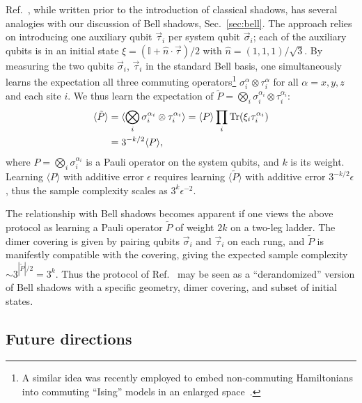 \documentclass[a4paper,twocolumns,11pt,accepted=2024-03-04]{quantumarticle}
\begin{document}
Ref.~\cite{jiang_optimal_2020}, while written prior to the introduction of classical shadows, has several analogies with our discussion of Bell shadows, Sec.~\ref{sec:bell}. 
The approach relies on introducing one auxiliary qubit $\vec{\tau}_i$ per system qubit $\vec{\sigma}_i$; each of the auxiliary qubits is in an initial state $\xi = (\mathbb{I} + \hat{n}\cdot \vec{\tau})/2$ with $\hat{n} = (1,1,1)/\sqrt{3}$. By measuring the two qubits $\vec{\sigma}_i$, $\vec{\tau}_i$ in the standard Bell basis, one simultaneously learns the expectation all three commuting operators\footnote{A similar idea was recently employed to embed non-commuting Hamiltonians into commuting ``Ising'' models in an enlarged space~\cite{verresen_everything_2023}.} $\sigma^\alpha_i \otimes \tau^\alpha_i $ for all $\alpha = x,y,z$ and each site $i$.
We thus learn the expectation of $\tilde{P} = \bigotimes_i \sigma_i^{\alpha_i} \otimes \tau_i^{\alpha_i}$: 
\begin{align}
    \langle \tilde{P} \rangle 
    & = \langle \bigotimes_i \sigma_i^{\alpha_i} \otimes \tau_i^{\alpha_i} \rangle = \langle P\rangle \prod_i \Tr(\xi_i \tau_i^{\alpha_i}) \nonumber \\
    & = 3^{-k/2} \langle P\rangle,
\end{align}
where $P = \bigotimes_i \sigma_i^{\alpha_i}$ is a Pauli operator on the system qubits, and $k$ is its weight. 
Learning $\langle P \rangle$ with additive error $\epsilon$ requires learning $\langle \tilde{P}\rangle$ with additive error $3^{-k/2}\epsilon$, thus the sample complexity scales as $3^k \epsilon^{-2}$.

The relationship with Bell shadows becomes apparent if one views the above protocol as learning a Pauli operator $\tilde{P}$ of weight $2k$ on a two-leg ladder. The dimer covering is given by pairing qubits $\vec{\sigma}_i$ and $\vec{\tau}_i$ on each rung, and $\tilde{P}$ is manifestly compatible with the covering, giving the expected sample complexity $\sim 3^{|\tilde{P}|/2} = 3^k$. 
Thus the protocol of Ref.~\cite{jiang_optimal_2020} may be seen as a ``derandomized'' version of Bell shadows with a specific geometry, dimer covering, and subset of initial states.

\subsection{Future directions}\label{sec:future_science}
\end{document}
